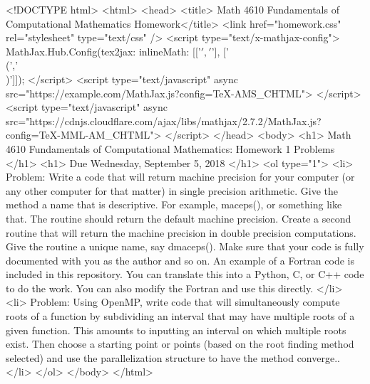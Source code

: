 <!DOCTYPE html>
<html>
<head>
  <title> Math 4610 Fundamentals of Computational Mathematics Homework</title>
  <link href="homework.css" rel="stylesheet" type="text/css" />
  <script type="text/x-mathjax-config">
    MathJax.Hub.Config({tex2jax: {inlineMath: [['$','$'], ['\\(','\\)']]}});
  </script>
  <script type="text/javascript" async
    src="https://example.com/MathJax.js?config=TeX-AMS_CHTML">
  </script>
  <script type="text/javascript" async
    src="https://cdnjs.cloudflare.com/ajax/libs/mathjax/2.7.2/MathJax.js?config=TeX-MML-AM_CHTML">
  </script>
</head>
<body>
  <h1>
    Math 4610 Fundamentals of Computational Mathematics: Homework 1 Problems
  </h1>
  <h1>
    Due Wednesday, September 5, 2018
  </h1>
  <ol type="1">
    <li> Problem: Write a code that will return machine precision for your computer (or any other computer for that matter) in
      single precision arithmetic. Give the method a name that is descriptive. For example, maceps(), or something like that.
      The routine should return the default machine precision. Create a second routine that will return the machine precision
      in double precision computations. Give the routine a unique name, say dmaceps(). Make sure that your code is fully
      documented with you as the author and so on. An example of a Fortran code is included in this repository. You can
      translate this into a Python, C, or C++ code to do the work. You can also modify the Fortran and use this directly.
    </li>
    <li> Problem: Using OpenMP, write code that will simultaneously compute roots of a function by subdividing an interval
      that may have multiple roots of a given function. This amounts to inputting an interval on which multiple roots exist.
      Then choose a starting point or points (based on the root finding method selected) and use the parallelization structure
      to have the method converge..
    </li>
  </ol>
</body>
</html>
